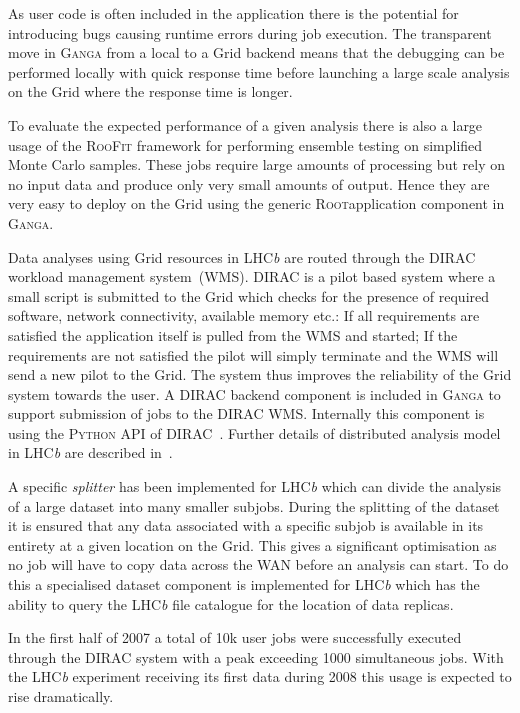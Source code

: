 \documentclass{elsart}
\def\lhcb {LHC{\em b\/}\xspace}
\def\dirac{DIRAC\xspace}
\def\ganga {\textsc{Ganga}\xspace}
\def\python {\textsc{Python}\xspace}
\def\root {\textsc{Root}\xspace}
\def\grid {Grid\xspace}
\def\roofit{\textsc{RooFit}\xspace}
\begin{document}
As user code is often included in the application there is the potential for
introducing bugs causing runtime errors during job execution. The transparent
move in \ganga from a local to a \grid backend means that the debugging can be
performed locally with quick response time before launching a large scale
analysis on the \grid where the response time is longer.

To evaluate the expected performance of a given analysis there is also a large
usage of the \roofit \cite{FIXME-roofit} framework for performing ensemble testing on simplified
Monte Carlo samples. These jobs require large amounts of processing but rely
on no input data and produce only very small amounts of output. Hence they are
very easy to deploy on the \grid using the generic \root \cite{FIXME-root}application component
in \ganga.

Data analyses using \grid resources in \lhcb are routed through the
\dirac~\cite{DIRAC} workload management system~(WMS). \dirac is a pilot based
system where a small script is submitted to the \grid which checks for the
presence of required software, network connectivity, available memory etc.: If
all requirements are satisfied the application itself is pulled from the WMS
and started; If the requirements are not satisfied the pilot will simply
terminate and the WMS will send a new pilot to the \grid. The system thus
improves the reliability of the \grid system towards the user. A \dirac backend
component is included in \ganga to support submission of jobs to the \dirac
WMS. Internally this component is using the \python API of
\dirac~\cite{DIRACAPI}.  Further details of distributed analysis model in
\lhcb are described in~\cite{lhcb:2005jj}.

A specific \emph{splitter} has been implemented for \lhcb which can divide the
analysis of a large dataset into many smaller subjobs. During the splitting of
the dataset it is ensured that any data associated with a specific subjob is
available in its entirety at a given location on the \grid. This gives a
significant optimisation as no job will have to copy data across the WAN
before an analysis can start. To do this a specialised dataset component is
implemented for \lhcb which has the ability to query the \lhcb file catalogue
for the location of data replicas.

In the first half of 2007 a total of 10k user jobs were successfully
executed through the \dirac system with a peak exceeding 1000 simultaneous
jobs. With the \lhcb experiment receiving its first data during 2008 this
usage is expected to rise dramatically.
\end{document}
